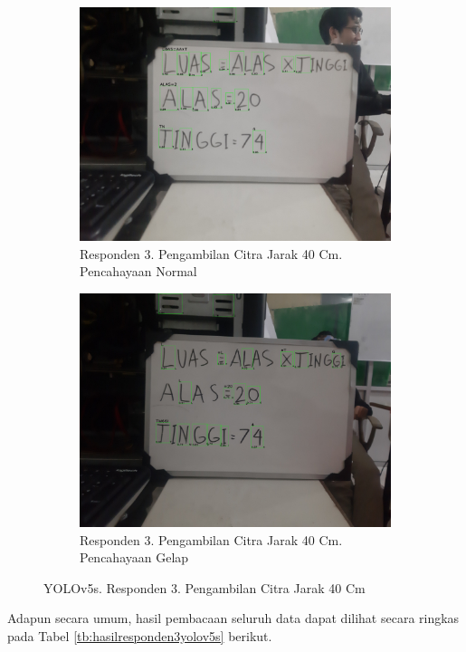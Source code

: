 \begin{figure}[H]
  \begin{subfigure}{.5\textwidth}
    \centering
    \captionsetup{width=.8\linewidth}
    \includegraphics[width=.8\linewidth]{gambar/yolov5s/responden3/hans40cm00-result.jpg}
    \caption{Responden 3. Pengambilan Citra Jarak 40 Cm. Pencahayaan Normal}
    \label{fig:sr3tcitra40cm}
  \end{subfigure}%
  \begin{subfigure}{.5\textwidth}
    \centering
    \captionsetup{width=.8\linewidth}
    \includegraphics[width=.8\linewidth]{gambar/yolov5s/responden3/hans40cm10-result.jpg}
    \caption{Responden 3. Pengambilan Citra Jarak 40 Cm. Pencahayaan Gelap}
    \label{fig:sr3gcitra40cm}
  \end{subfigure}
  \caption{YOLOv5s. Responden 3. Pengambilan Citra Jarak 40 Cm}
  \label{fig:sr3citra40cm}
\end{figure}

Adapun secara umum, hasil pembacaan seluruh data dapat dilihat secara ringkas pada Tabel \ref*{tb:hasilresponden3yolov5s} berikut.

